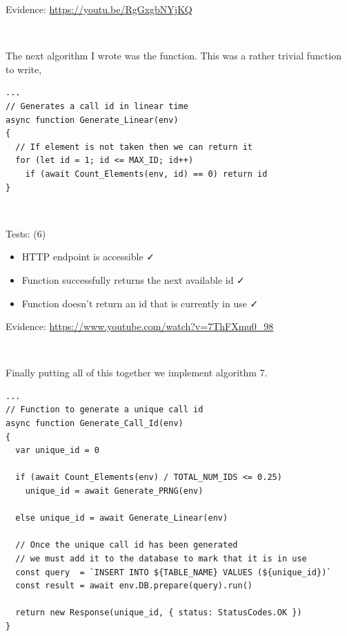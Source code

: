 {\sffamily Evidence:} \url{https://youtu.be/RgGxgbNYjKQ}\\ \vspace{0.2cm}

{\color{gray} \hrulefill} \\ \vspace{0.2cm}

The next algorithm I wrote was the 
function. This was a rather trivial function to write,

\begin{verbatim}
...
// Generates a call id in linear time
async function Generate_Linear(env)
{
  // If element is not taken then we can return it
  for (let id = 1; id <= MAX_ID; id++)
    if (await Count_Elements(env, id) == 0) return id
}
\end{verbatim}

{\color{gray} \hrulefill} \\ \vspace{0.2cm}

{\sffamily Tests: (6)}

\begin{itemize}
  \item HTTP endpoint is accessible \faCheck \\
  \item Function successfully returns the next available id \faCheck \\
  \item Function doesn't return an id that is currently in use \faCheck \\
\end{itemize}

{\sffamily Evidence:} \url{https://www.youtube.com/watch?v=7ThFXmu0_98}\\ \vspace{0.2cm}

{\color{gray} \hrulefill} \\ \vspace{0.2cm}

Finally putting all of this together we implement algorithm 7.

\begin{verbatim}
...
// Function to generate a unique call id
async function Generate_Call_Id(env)
{
  var unique_id = 0

  if (await Count_Elements(env) / TOTAL_NUM_IDS <= 0.25)
    unique_id = await Generate_PRNG(env)

  else unique_id = await Generate_Linear(env)

  // Once the unique call id has been generated
  // we must add it to the database to mark that it is in use
  const query  = `INSERT INTO ${TABLE_NAME} VALUES (${unique_id})`
  const result = await env.DB.prepare(query).run()

  return new Response(unique_id, { status: StatusCodes.OK })
}
\end{verbatim}


